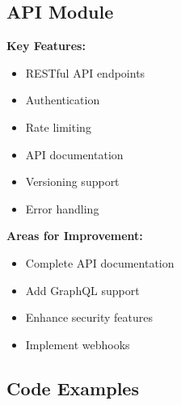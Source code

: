 \subsection{API Module}
\begin{tcolorbox}[
    enhanced,
    title={API Module: 60\% Complete},
    attach boxed title to top left,
    boxed title style={
        colback=warning!50,
        colframe=warning!50,
        arc=0mm,
    },
    colback=white,
    colframe=warning!50,
    arc=0mm,
    fonttitle=\bfseries
]
    \textbf{Key Features:}
    \begin{itemize}
        \item RESTful API endpoints
        \item Authentication
        \item Rate limiting
        \item API documentation
        \item Versioning support
        \item Error handling
    \end{itemize}
    
    \textbf{Areas for Improvement:}
    \begin{itemize}
        \item Complete API documentation
        \item Add GraphQL support
        \item Enhance security features
        \item Implement webhooks
    \end{itemize}
\end{tcolorbox}

\subsection{Code Examples}

